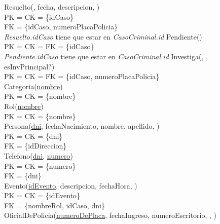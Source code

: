 \documentclass[10pt,a4paper]{article}
\begin{document}
\newline
Resuelto(, fecha, descripcion, )\\ 
	PK = CK = \{idCaso\}\\ 
	FK = \{idCaso, numeroPlacaPolicia\}\\ 	
\newline
\textit{Resuelto.idCaso} tiene que estar en \textit{CasoCriminal.id}
\newline
\newline
Pendiente()\\ 
  PK = CK = FK = \{idCaso\}\\ 
\newline
\textit{Pendiente.idCaso} tiene que estar en \textit{CasoCriminal.id}
\newline
\newline
Investiga(, , esInvPrincipal?)\\ 
  PK = CK = FK = \{idCaso, numeroPlacaPolicia\}\\ 
\newline
\newline
Categoria(\underline{nombre})\\ 
	PK = CK = \{nombre\}\\ 
\newline
Rol(\underline{nombre})\\ 
	PK = CK = \{nombre\}\\ 
\newline
Persona(\underline{dni}, fechaNacimiento, nombre, apellido, )\\ 
	PK = CK = \{dni\}\\ 
	FK = \{idDireccion\}\\ 
\newline
Telefono(\underline{\underline{dni}}, \underline{numero})\\ 
	PK = CK = \{numero\}\\
	FK = \{dni\}\\ 
\newline
Evento(\underline{idEvento}, descripcion, fechaHora, )\\ 
	PK = CK  = \{idEvento\}\\ 
	FK = \{nombreRol, idCaso, dni\}\\
\newline
OficialDePolicia(\underline{numeroDePlaca}, fechaIngreso, numeroEscritorio, , )\\
\end{document}
